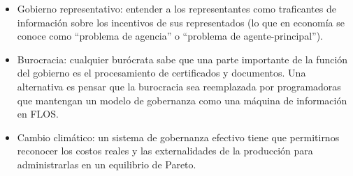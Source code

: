 \documentclass[
]{article}
\begin{document}
\begin{itemize}
\item
  Gobierno representativo: entender a los representantes como
  traficantes de información sobre los incentivos de sus representados
  (lo que en economía se conoce como ``problema de agencia'' o
  ``problema de agente-principal'').
\item
  Burocracia: cualquier burócrata sabe que una parte importante de la
  función del gobierno es el procesamiento de certificados y documentos.
  Una alternativa es pensar que la burocracia sea reemplazada por
  programadoras que mantengan un modelo de gobernanza como una máquina
  de información en FLOS.
\item
  Cambio climático: un sistema de gobernanza efectivo tiene que
  permitirnos reconocer los costos reales y las externalidades de la
  producción para administrarlas en un equilibrio de Pareto.
\end{itemize}
\end{document}
